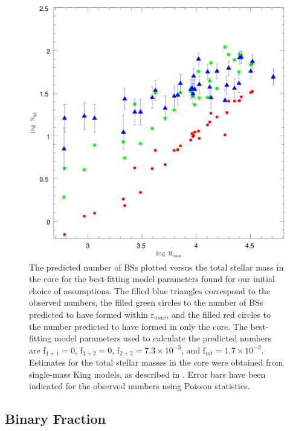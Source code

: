 \begin{figure} [!h]
  \begin{center}
 \includegraphics[scale=0.5]{Chapter-5/fig1.eps}
\caption[The predicted number of BSs plotted versus the total stellar
mass in the core for the best-fitting model parameters found for our
initial choice of assumptions]{
The predicted number of BSs plotted versus the total stellar
mass in the core for the best-fitting model parameters found for our
initial choice of assumptions.  The filled blue triangles correspond to
  the observed numbers, the 
  filled green circles to the number of BSs predicted to have formed within
  r$_{max}$, and the filled red circles to the number predicted to
  have formed in only the core.  The best-fitting model parameters
  used to calculate the predicted numbers are f$_{1+1} = 0$, f$_{1+2} = 0$,
  f$_{2+2} = 7.3 \times 10^{-3}$, and f$_{mt} = 1.7 \times 10^{-3}$.  
  Estimates for the total stellar masses in the core were obtained
  from single-mass King models, as described in \citet{leigh11a}.
  Error bars have been indicated for the observed numbers using 
  Poisson statistics.
\label{fig:model_best}}
\end{center}
\end{figure}

\subsection{Binary Fraction} \label{results-binary}

